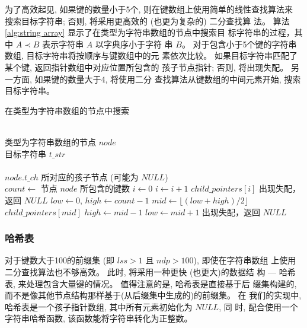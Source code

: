 为了高效起见, 如果键的数量小于5个, 则在键数组上使用简单的线性查找算法来
搜索目标字符串; 否则, 将采用更高效的 (也更为复杂的) 二分查找算
法。 算法 \ref{alg:string array} 显示了在类型为字符串数组的节点中搜索目
标字符串的过程，其中 $A \prec B$ 表示字符串 $A$ 以字典序小于字符
串 $B$。 对于包含小于5个键的字符串数组, 目标字符串将按顺序与键数组中的元
素依次比较。 如果目标字符串匹配了某个键, 返回指针数组中对应位置所包含的
孩子节点指针; 否则, 将出现失配。 另一方面, 如果键的数量大于4, 将使用二分
查找算法从键数组的中间元素开始, 搜索目标字符串。

\begin{algorithm}
  \caption{在类型为字符串数组的节点中搜索}\scriptsize
  \label{alg:string array}
  \begin{algorithmic}[1]
    \REQUIRE ~~\\
    类型为字符串数组的节点 $node$ \\
    目标字符串 $t\_str$\\
    \ENSURE ~~\\
     $node.t\_ch$ 所对应的孩子节点 (可能为 $NULL$)\\
    \STATE
    \STATE $count \leftarrow$ 节点 $node$  所包含的键数
    \STATE
    \STATE $i \leftarrow 0$
    \STATE $i \leftarrow i+1$
    \ENDWHILE
    \RETURN $child\_pointers[i]$
    \ELSE
    \STATE 出现失配，返回 $NULL$
    \ENDIF
    \ELSE
    \STATE $low \leftarrow 0$, $high \leftarrow count-1$
    \STATE $mid \leftarrow \lfloor (low+high)/2 \rfloor$
    \RETURN $child\_pointers[mid]$
    \STATE $high \leftarrow mid - 1$
    \ELSE
    \STATE $low \leftarrow mid + 1$
    \ENDIF
    \ENDWHILE
    \STATE 出现失配，返回 $NULL$
    \ENDIF
  \end{algorithmic}
\end{algorithm}

\subsubsection{哈希表}
\label{sec:hash table}

对于键数大于100的前缀集 (即 $lss > 1$ 且 $ndp > 100$), 即使在字符串数组
上使用二分查找算法也不够高效。 此时, 将采用一种更快 (也更大)的数据结
构 --- 哈希表, 来处理包含大量键的情况。 值得注意的是, 哈希表是直接基于后
缀集构建的, 而不是像其他节点结构那样基于(从后缀集中生成的)的前缀集。 在
我们的实现中, 哈希表是一个孩子指针数组, 其中所有元素初始化为 $NULL$, 同
时, 配合使用一个字符串哈希函数, 该函数能将字符串转化为正整数。

